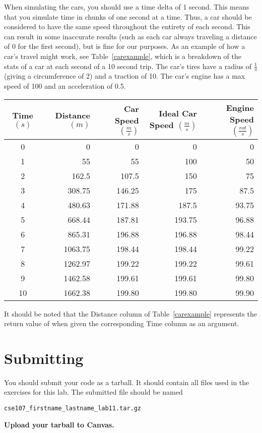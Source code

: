\documentclass[11pt]{cselabheader}
\begin{document}
\begin{ex}
  When simulating the cars, you should use a time delta of 1 second. This means
  that you simulate time in chunks of one second at a time. Thus, a car should
  be considered to have the same speed throughout the entirety of each second.
  This can result in some inaccurate results (such as each car always
  traveling a distance of 0 for the first second), but is fine for our
  purposes. As an example of how a car's travel might work, see
  Table~\ref{carexample}, which is a breakdown of the stats of a car at each
  second of a 10 second trip. The car's tires have a radius of $\frac{1}{\pi}$
  (giving a circumference of 2) and a traction of 10. The car's engine has a
  max speed of 100 and an acceleration of 0.5.
  
  \begin{center}
    \begin{tabular}{crrrr}
    \toprule
    Time $(s)$ & Distance $(m)$ & Car Speed $(\frac{m}{s})$ &
    Ideal Car Speed $(\frac{m}{s})$ & Engine Speed $(\frac{rot}{s})$\\
    \midrule
    0 & 0 & 0 & 0 & 0\\
    1 & 55 & 55 & 100 & 50\\
    2 & 162.5 & 107.5 & 150 & 75\\
    3 & 308.75 & 146.25 & 175 & 87.5\\
    4 & 480.63 & 171.88 & 187.5 & 93.75\\
    5 & 668.44 & 187.81 & 193.75 & 96.88\\
    6 & 865.31 & 196.88 & 196.88 & 98.44\\
    7 & 1063.75 & 198.44 & 198.44 & 99.22\\
    8 & 1262.97 & 199.22 & 199.22 & 99.61\\
    9 & 1462.58 & 199.61 & 199.61 & 99.80\\
    10 & 1662.38 & 199.80 & 199.80 & 99.90\\
    \bottomrule
    \end{tabular}
    \label{carexample}
  \end{center}
  
  It should be noted that the Distance column of Table~\ref{carexample}
  represents the return value of  when given the
  corresponding Time column as an argument.
\end{ex}

\pagebreak
\section{Submitting}
You should submit your code as a tarball. It should contain all files
used in the exercises for this lab. The submitted file should be named
\begin{center}
  \texttt{cse107\_firstname\_lastname\_lab11.tar.gz}
\end{center}

\begin{center}
  \textbf{Upload your tarball to Canvas.}
\end{center}

\listoftheorems
\end{document}
